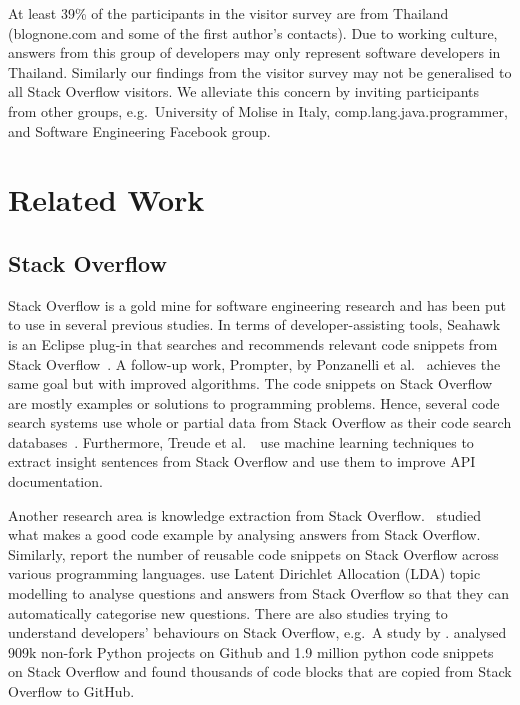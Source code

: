 \documentclass{svjour3}                     %
\begin{document}
At least 39\% of the participants in the visitor survey are from Thailand
(\textsf{blognone.com} and some of the first author's contacts). Due to working
culture, answers from this group of developers may only represent software
developers in Thailand. Similarly our findings from the visitor survey may not
be generalised to all Stack Overflow visitors. We alleviate this concern by
inviting participants from other groups, e.g.~University of Molise in Italy,
comp.lang.java.programmer, and Software Engineering Facebook group.

\section{Related Work}

\subsection{Stack Overflow}

Stack Overflow is a gold mine for software engineering research and has been put
to use in several previous studies. In terms of developer-assisting tools,
Seahawk is an Eclipse plug-in that searches and recommends relevant code
snippets from Stack Overflow~\citep{Ponzanelli2013}. A follow-up work, Prompter,
by Ponzanelli et al.~\citep{Ponzanelli2014} achieves the same goal but with
improved algorithms. The code snippets on Stack Overflow are mostly examples or
solutions to programming problems. Hence, several code search systems use whole
or partial data from Stack Overflow as their code search
databases~\citep{Keivanloo2014,Park2014,
	Stolee2014,Subramanian2013,Diamantopoulos2015}. Furthermore, Treude et
al.~\cite{Treude2016}~use machine learning techniques to extract insight
sentences from Stack Overflow and use them to improve API documentation.

Another research area is knowledge extraction from Stack Overflow.
\cite{Nasehi2012}~studied what makes a good code example by analysing answers
from Stack Overflow. Similarly, \cite{Yang2016} report the number of reusable
code snippets on Stack Overflow across various programming languages.
\cite{Wang2013_StackOverflow} use Latent Dirichlet Allocation (LDA) topic
modelling to analyse questions and answers from Stack Overflow so that they can
automatically categorise new questions. There are also studies trying to
understand developers' behaviours on Stack Overflow, e.g.~A study by
\cite{Movshovitz-Attias2013,Rosen2016,Choetkiertikul2015,Bosu2013}.
\cite{Yang2017} analysed 909k non-fork Python projects on Github and 1.9 million
python code snippets on Stack Overflow and found thousands of code blocks that
are copied from Stack Overflow to GitHub.
\end{document}
